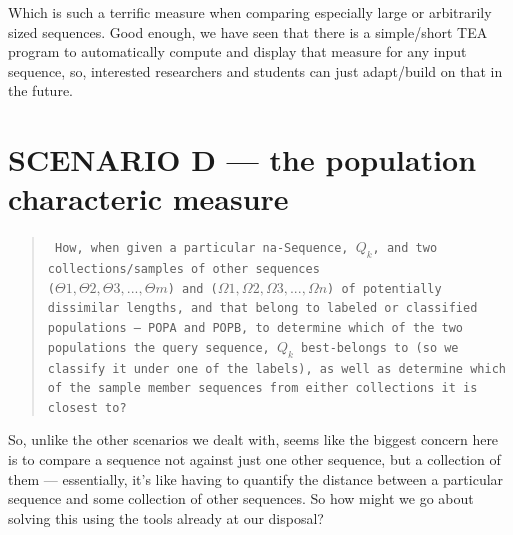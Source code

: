 \documentclass[a4paper, 18pt]{book} %
\begin{document}
Which is such a terrific measure when comparing especially large or arbitrarily sized sequences. Good enough, we have seen that there is a simple/short TEA program to automatically compute and display that measure for any input sequence, so, interested researchers and students can just adapt/build on that in the future.

\section{SCENARIO D --- the population characteric measure}
\label{SECSCEND}

\begin{quote}
\small
\texttt{
How, when given a particular na-Sequence, $Q_k$, and two collections/samples of other sequences\\
 ($\Theta1, \Theta2, \Theta3,..., \Theta m$) and ($\Omega1, \Omega2, \Omega3,..., \Omega n$) of potentially dissimilar lengths, and that belong to labeled or classified populations --- POPA and POPB, to determine which of the two populations the query sequence, $Q_k$ best-belongs to (so we classify it under one of the labels), as well as determine which of the sample member sequences from either collections it is closest to?}
\end{quote}


So, unlike the other scenarios we dealt with, seems like the biggest concern here is to compare a sequence not against just one other sequence, but a collection of them --- essentially, it's like having to quantify the distance between a particular sequence and some collection of other sequences. So how might we go about solving this using the tools already at our disposal?
\end{document}
